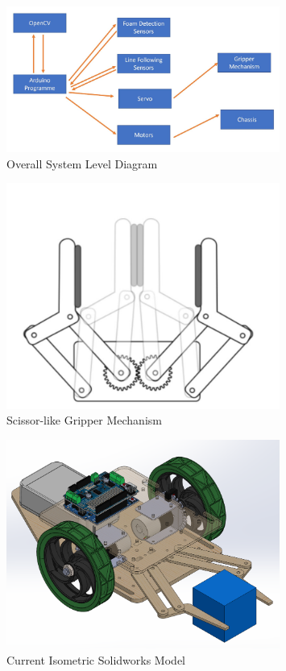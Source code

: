 \documentclass{article}
\begin{document}
\begin{figure}[!h]
    \centering
    \includegraphics[width=0.8\textwidth]{assets/Overall_sys.jpg}
    \caption{Overall System Level Diagram}
    \label{fig:overall_sys}
\end{figure}


\begin{figure}[!h]
    \centering
    \includegraphics[width=0.8\textwidth]{assets/Gripper_Mechanism.jpg}
    \caption{Scissor-like Gripper Mechanism}
    \label{fig:grip_mech}
\end{figure}

\begin{figure}[!h]
    \centering
    \includegraphics[width=0.8\textwidth]{assets/isometric.png}
    \caption{Current Isometric Solidworks Model}
    \label{fig:isometric}
\end{figure}
\end{document}
